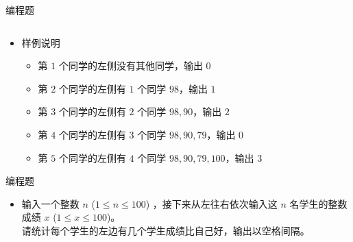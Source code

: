 \begin{frame}[fragile]
{{\begin{exampleblock}{编程题}
\begin{columns}[onlytextwidth,T]
\begin{itemize}
                        
                        
    
                    \end{itemize}
                \end{columns}
    
                \begin{itemize}
                    \item 样例说明\\
                    \begin{itemize}
                        \item<3-> 第 $1$ 个同学的左侧没有其他同学，输出 $0$
                        \item<4-> 第 $2$ 个同学的左侧有 $1$ 个同学 $98$，输出 $1$
                        \item<5-> 第 $3$ 个同学的左侧有 $2$ 个同学 $98,90$，输出 $2$
                        \item<6-> 第 $4$ 个同学的左侧有 $3$ 个同学 $98,90,79$，输出 $0$
                        \item<7-> 第 $5$ 个同学的左侧有 $4$ 个同学 $98,90,79,100$，输出 $3$
                    \end{itemize}
                \end{itemize}

            \end{exampleblock}

        }{
            \begin{exampleblock}{编程题}

                \begin{itemize}
                    \item 输入一个整数 $n$ ($1 \le n \le 100$) ，接下来从左往右依次输入这 $n$ 名学生的整数成绩 $x$ ($1 \le x \le 100$)。\\
                        请统计每个学生的左边有几个学生成绩比自己好，输出以空格间隔。


\end{itemize}
\end{exampleblock}}}
\end{frame}
